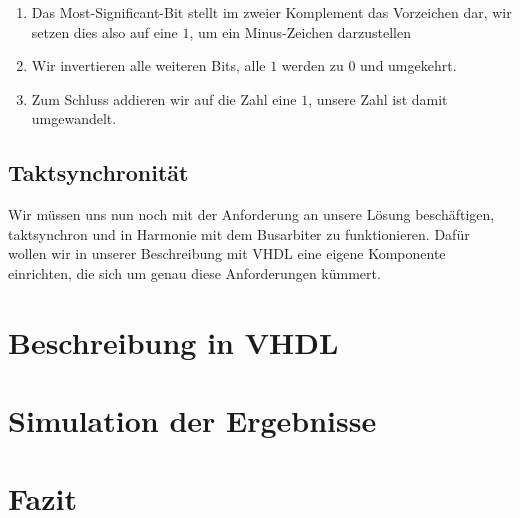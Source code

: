 \documentclass{report}
\begin{document}
\begin{enumerate}
  \item Das Most-Significant-Bit stellt im zweier Komplement das Vorzeichen dar, wir setzen dies also auf eine $1$, um ein Minus-Zeichen darzustellen
  \item Wir invertieren alle weiteren Bits, alle $1$ werden zu $0$ und umgekehrt.
  \item Zum Schluss addieren wir auf die Zahl eine $1$, unsere Zahl ist damit umgewandelt.
\end{enumerate}

\subsection{Taktsynchronität}
\label{sec:taktsynchronitat}

Wir müssen uns nun noch mit der Anforderung an unsere Lösung beschäftigen, taktsynchron und in Harmonie mit dem Busarbiter zu funktionieren. Dafür wollen wir in unserer Beschreibung mit VHDL eine eigene Komponente einrichten, die sich um genau diese Anforderungen kümmert.

\section{Beschreibung in VHDL}
\label{sec:beschreibung-vhdl-1}

\section{Simulation der Ergebnisse}
\label{sec:simul-der-ergebn-1}

\section{Fazit}
\label{sec:fazit-1}
\end{document}
